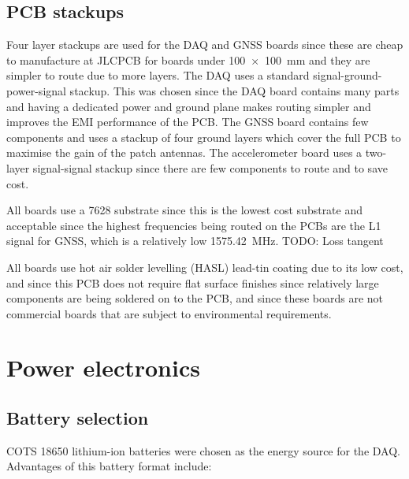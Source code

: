 \documentclass{report}
\begin{document}
\subsection{PCB stackups}
Four layer stackups are used for the DAQ and GNSS boards since these are cheap to manufacture at JLCPCB for boards under \SI{100x100}{\milli\meter} and they are simpler to route due to more layers. The DAQ uses a standard signal-ground-power-signal stackup. This was chosen since the DAQ board contains many parts and having a dedicated power and ground plane makes routing simpler and improves the EMI performance of the PCB. The GNSS board contains few components and uses a stackup of four ground layers which cover the full PCB to maximise the gain of the patch antennas. The accelerometer board uses a two-layer signal-signal stackup since there are few components to route and to save cost.

All boards use a 7628 substrate since this is the lowest cost substrate and acceptable since the highest frequencies being routed on the PCBs are the L1 signal for GNSS, which is a relatively low \SI{1575.42}{\mega\hertz}. TODO: Loss tangent

All boards use hot air solder levelling (HASL) lead-tin coating due to its low cost, and since this PCB does not require flat surface finishes since relatively large components are being soldered on to the PCB, and since these boards are not commercial boards that are subject to environmental requirements.

\section{Power electronics}

\subsection{Battery selection}

COTS 18650 lithium-ion batteries were chosen as the energy source for the DAQ. Advantages of this battery format include:
\end{document}
